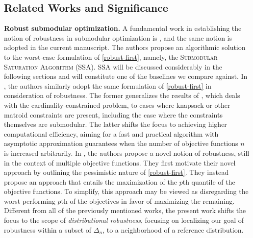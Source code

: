 \documentclass[letter,11pt]{article}
\begin{document}
\subsection{Related Works and Significance}
\textbf{Robust submodular optimization.} 
A fundamental work in establishing the notion of robustness in submodular optimization is \cite{RSOS}, and the same notion is adopted in the current manuscript. The authors propose an algorithmic solution to the worst-case formulation of \eqref{robust-first}, namely, the \textsc{Submodular Saturation Algorithm (SSA)}. SSA will be discussed considerably in the following sections and will constitute one of the baselines we compare against. 
In \cite{Powers2016ConstrainedRS, NEURIPS2018_7e448ed9}, the authors similarly adopt the same formulation of \eqref{robust-first} in consideration of robustness. The former generalizes the results of \cite{RSOS}, which deals with the cardinality-constrained problem, to cases where knapsack or other matroid constraints are present, including the case where the constraints themselves are submodular. The latter shifts the focus to achieving higher computational efficiency, aiming for a fast and practical algorithm with asymptotic approximation guarantees when the number of objective functions $n$ is increased arbitrarily. 
In \cite{malherbe2022robustness}, the authors propose a novel notion of robustness, still in the context of multiple objective functions. They first motivate their novel approach by outlining the pessimistic nature of \eqref{robust-first}. They instead propose an approach that entails the maximization of the $p$th quantile of the objective functions. To simplify, this approach may be viewed as disregarding the worst-performing $p$th of the objectives in favor of maximizing the remaining. Different from all of the previously mentioned works, the present work shifts the focus to the scope of \textit{distributional robustness}, focusing on localizing our goal of robustness within a subset of $\Delta_n$, to a neighborhood of a reference distribution. 
\end{document}
